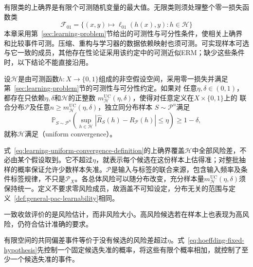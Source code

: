 有限类的上确界是有限个可测随机变量的最大值。无限类则须处理整个零一损失函数类
\[
 \mathcal F_{01}=\{(x,y)\mapsto\ell_{01}(h(x),y):h\in\mathcal H\}
\]
本章采用第~\ref{sec:learning-problem}节给出的可测性与可分性条件，使相关上确界和比较事件可测。压缩、重构与学习器的数据依赖映射也须可测。可实现样本可选与它一致的成员，其他存在性论证采用该约定中的可测近似ERM；缺少这些条件时，以下结论不能直接沿用。

\begin{definition}[一致收敛]
\label{def:learning-uniform-convergence}
设$\mathcal H$是由可测函数$h:X\to\{0,1\}$组成的非空假设空间，采用零一损失并满足
第~\ref{sec:learning-problem}节的可测性与可分性约定。如果对
任意$\eta,\delta\in(0,1)$，都存在只依赖$\eta,\delta$和$\mathcal H$的正整数
$m_{\mathcal H}^{\mathrm{UC}}(\eta,\delta)$，使得对任意定义在$X\times\{0,1\}$上的
联合分布$\mathcal P$及任意$n\geq m_{\mathcal H}^{\mathrm{UC}}(\eta,\delta)$，独立同分布样本
$S\sim\mathcal P^n$满足
\begin{equation}
 \mathbb P_{S\sim\mathcal P^n}\left(
   \sup_{h\in\mathcal H}|\hat R_S(h)-R_{\mathcal P}(h)|\leq\eta
 \right)\geq1-\delta,
 \label{eq:learning-uniform-convergence-definition}
\end{equation}
就称$\mathcal H$满足（uniform convergence）。
\end{definition}

式~\eqref{eq:learning-uniform-convergence-definition}的上确界覆盖$\mathcal H$中全部风险差，不必由某个假设取到。它不超过$\eta$，就表示每个候选在这份样本上估得准；对整批抽样的概率保证允许少数样本失准。$\mathcal P$是输入与标签的联合来源，包含输入频率及条件标签规律，不只是$\mathcal P_X$。各总体风险可以随分布改变，充分样本量$m_{\mathcal H}^{\mathrm{UC}}(\eta,\delta)$须保持统一。定义不要求零风险成员，故涵盖不可知设定，分布无关的范围与定义~\ref{def:general-pac-learnability}相同。

一致收敛评价的是风险估计，而非风险大小。高风险候选若在样本上也表现为高风险，仍符合估计准确的要求。

有限空间的共同偏差事件等价于没有候选的风险差超过$\eta$。式~\eqref{eq:hoeffding-fixed-hypothesis}先控制一个固定候选失准的概率，将这些有限个概率相加，就控制了至少一个候选失准的事件。

